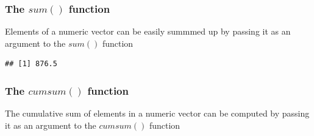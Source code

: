 \subsubsection{The $sum()$ function}
\noindent Elements of a numeric vector can be easily summmed up by passing it as an argument to the $sum()$ function
\begin{knitrout}
\color{fgcolor}\begin{kframe}
\begin{alltt}
\hlopt{$}
\end{alltt}
\begin{verbatim}
## [1] 876.5
\end{verbatim}
\end{kframe}
\end{knitrout}

\subsubsection{The $cumsum()$ function}
\noindent The cumulative sum of elements in a numeric vector can be computed by passing it as an argument to the $cumsum()$ function
\begin{knitrout}
\color{fgcolor}\begin{kframe}
\begin{alltt}
\hlopt{$}
\end{alltt}
\end{kframe}
\end{knitrout}


